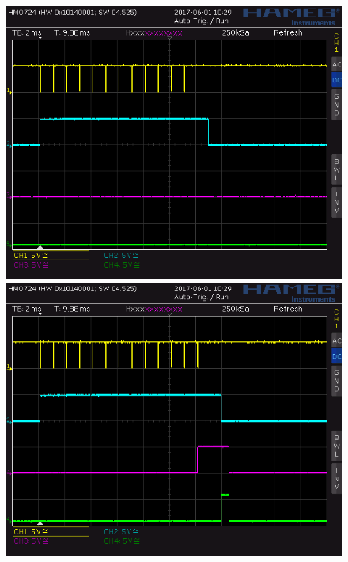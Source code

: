 \documentclass[french]{layout/Report}
\begin{document}
\begin{figure}
\begin{minipage}[b]{0.5\linewidth}
\centering
\includegraphics[width=\textwidth]{../measurements/SCR06}
\end{minipage}
\hspace{0.05cm}
\begin{minipage}[b]{0.5\linewidth}
\centering
\includegraphics[width=\textwidth]{../measurements/SCR07}
\end{minipage}
\begin{minipage}[b]{0.5\linewidth}
\vspace{0.05cm}

\end{minipage}
\end{figure}
\end{document}
